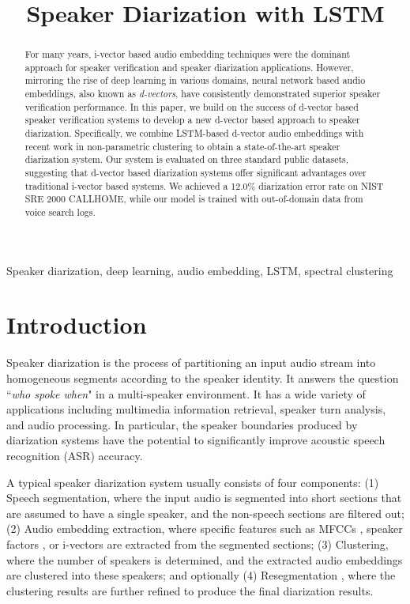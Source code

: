 \documentclass{article}
\title{Speaker Diarization with LSTM}
\begin{document}
\ninept
\maketitle
\begin{abstract}
For many years, i-vector based audio embedding techniques were the dominant approach
for speaker verification and speaker diarization applications.
However, mirroring the rise of deep learning in various domains, neural network based
audio embeddings, also known as \textit{d-vectors}, have consistently demonstrated superior
speaker verification performance.
In this paper, we build on the success of d-vector based speaker verification systems to develop a new d-vector based approach to speaker diarization.
Specifically, we combine LSTM-based d-vector audio embeddings with recent work in non-parametric clustering to obtain a state-of-the-art speaker diarization system.
Our system is evaluated on three standard public datasets,
suggesting that d-vector based diarization systems offer significant advantages over traditional
i-vector based systems.
We achieved a 12.0\% diarization error rate on NIST SRE 2000 CALLHOME,
while our model is trained with out-of-domain data from voice search logs.
\end{abstract}
\begin{keywords}
Speaker diarization, deep learning, audio embedding, LSTM, spectral clustering
\end{keywords}
\section{Introduction}
\label{sec:intro}

Speaker diarization is the process of partitioning an input audio stream into homogeneous segments according to the speaker identity. It answers the question ``\textit{who spoke when}" in a multi-speaker environment. It has a wide variety of applications including multimedia information retrieval,
speaker turn analysis, and audio processing. In particular, the speaker boundaries
produced by diarization systems have the potential to significantly improve acoustic speech recognition (ASR) accuracy.

A typical speaker diarization system usually consists of four components: (1) Speech segmentation, where the input audio is segmented into short sections that are assumed to have a single speaker, and the non-speech sections are filtered out; (2) Audio embedding extraction, where specific features such as MFCCs \cite{kenny2010diarization}, speaker factors \cite{castaldo2008stream}, or i-vectors \cite{shum2013unsupervised,senoussaoui2014study,sell2014speaker} are extracted from the segmented sections; (3) Clustering, where the number of speakers is determined, and the extracted audio embeddings are clustered into these speakers; and optionally (4) Resegmentation \cite{sell2015diarization}, where the clustering results are further refined to produce the final diarization results.
\end{document}
